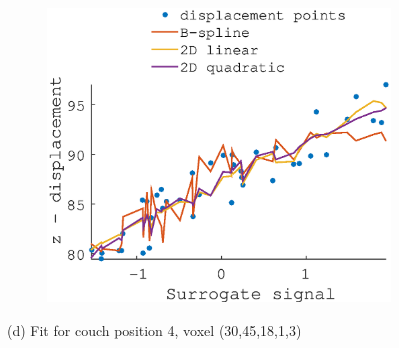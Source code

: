 \documentclass[11pt,a4paper,oneside]{report}
\begin{document}
\begin{figure}
\begin{subfigure}[b]{0.33\textwidth}
  \end{subfigure}
    ~ %
  \begin{subfigure}[b]{0.33\textwidth}
    \includegraphics[width=\textwidth, trim=0 0 0 110,clip=true]{figures/task2/fit_round3_couch4.eps}
  \end{subfigure}
   (d) Fit for couch position 4, voxel (30,45,18,1,3)
  \vspace*{1em}


\end{figure}
\end{document}
